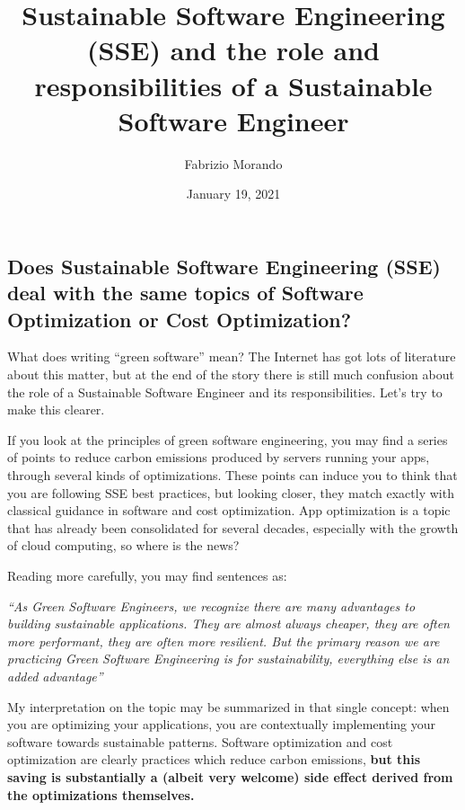 \documentclass{article}
\title{Sustainable Software Engineering (SSE) and the role and responsibilities of a Sustainable Software Engineer}
\author{Fabrizio Morando}
\date{January 19, 2021}
\begin{document}
\maketitle

\subsection*{Does Sustainable Software Engineering (SSE) deal with the same topics of Software Optimization or Cost Optimization?}

What does writing “green software” mean? The Internet has got lots of literature about this matter, but at the end of the story there is still much confusion about the role of a Sustainable Software Engineer and its responsibilities. Let’s try to make this clearer.

\vspace{\baselineskip}
If you look at the principles of green software engineering, you may find a series of points to reduce carbon emissions produced by servers running your apps, through several kinds of optimizations. These points can induce you to think that you are following SSE best practices, but looking closer, they match exactly with classical guidance in software and cost optimization. App optimization is a topic that has already been consolidated for several decades, especially with the growth of cloud computing, so where is the news?

\vspace{\baselineskip}
Reading more carefully, you may find sentences as:

\vspace{\baselineskip}
\textit{“As Green Software Engineers, we recognize there are many advantages to building sustainable applications. They are almost always cheaper, they are often more performant, they are often more resilient. But the primary reason we are practicing Green Software Engineering is for sustainability, everything else is an added advantage”}

\vspace{\baselineskip}
My interpretation on the topic may be summarized in that single concept: when you are optimizing your applications, you are contextually implementing your software towards sustainable patterns. Software optimization and cost optimization are clearly practices which reduce carbon emissions, \textbf{but this saving is substantially a (albeit very welcome) side effect derived from the optimizations themselves.}
\end{document}
